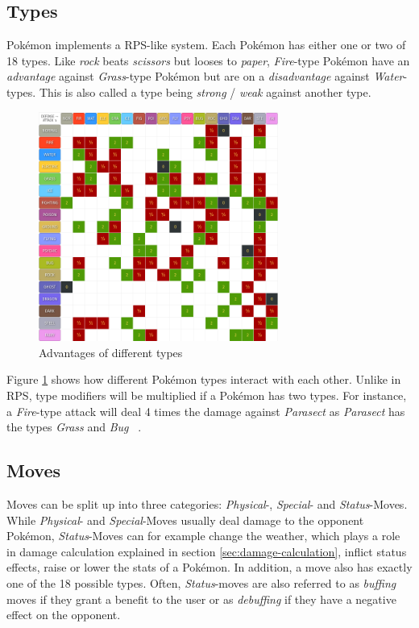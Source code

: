 \subsection{Types}
\label{sec:types}
Pokémon implements a \ac{RPS}-like system. Each Pokémon has either one or two of 
18 types. Like \emph{rock} beats \emph{scissors} but looses to \emph{paper}, \textit{Fire}-type Pokémon have an
\textit{advantage} against \textit{Grass}-type Pokémon but are on a \textit{disadvantage} against \textit{Water}-types.
This is also called a type being \textit{strong} / \textit{weak} against another type.
\begin{figure}
	\centering
	\includegraphics[width=0.7\textwidth]{images/type_chart.png}
	\caption{Advantages of different types ~\autocite{Pokemondb:Type}}
	\label{fig:type_chart}
\end{figure}
Figure \ref{fig:type_chart} shows how different Pokémon types interact with each other.
Unlike in \ac{RPS}, type modifiers will be multiplied if a Pokémon has two types. For instance, a \textit{Fire}-type
attack will deal 4 times the damage against \textit{Parasect} as \textit{Parasect} has the types \textit{Grass} and
\textit{Bug} ~\autocite{Veekun:Parasect}.

\subsection{Moves}
\label{sec:moves}
Moves can be split up into three categories: \textit{Physical}-, \textit{Special}- and \textit{Status}-Moves.
While \textit{Physical}- and \textit{Special}-Moves usually deal damage to the opponent Pokémon, 
\textit{Status}-Moves can for example change the weather, which plays a role in damage calculation explained
in section \ref{sec:damage-calculation}, inflict status effects, raise or lower the stats of a Pokémon. In 
addition, a move also has exactly one of the 18 possible types. Often, \textit{Status}-moves are also referred
to as \textit{buffing} moves if they grant a benefit to the user or as \textit{debuffing} if they have a
negative effect on the opponent.

